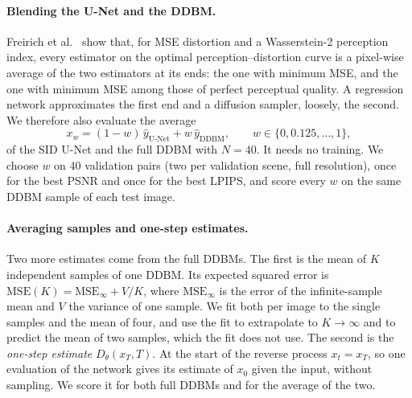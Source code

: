 \paragraph{Blending the U-Net and the DDBM.} Freirich et al.~\cite{freirich2021wasserstein} show that, for MSE distortion and a Wasserstein-2 perception index, every estimator on the optimal perception--distortion curve is a pixel-wise average of the two estimators at its ends: the one with minimum MSE, and the one with minimum MSE among those of perfect perceptual quality. A regression network approximates the first end and a diffusion sampler, loosely, the second. We therefore also evaluate the average
\begin{equation}
x_w = (1-w)\,\hat y_{\text{U-Net}} + w\,\hat y_{\text{DDBM}},\qquad w\in\{0, 0.125, \dots, 1\},
\end{equation}
of the SID U-Net and the full DDBM with $N=40$. It needs no training. We choose $w$ on 40 validation pairs (two per validation scene, full resolution), once for the best PSNR and once for the best LPIPS, and score every $w$ on the same DDBM sample of each test image.

\paragraph{Averaging samples and one-step estimates.} Two more estimates come from the full DDBMs. The first is the mean of $K$ independent samples of one DDBM. Its expected squared error is $\mathrm{MSE}(K)=\mathrm{MSE}_\infty+V/K$, where $\mathrm{MSE}_\infty$ is the error of the infinite-sample mean and $V$ the variance of one sample. We fit both per image to the single samples and the mean of four, and use the fit to extrapolate to $K\to\infty$ and to predict the mean of two samples, which the fit does not use. The second is the \emph{one-step estimate} $D_\theta(x_T,T)$. At the start of the reverse process $x_t=x_T$, so one evaluation of the network gives its estimate of $x_0$ given the input, without sampling. We score it for both full DDBMs and for the average of the two.

